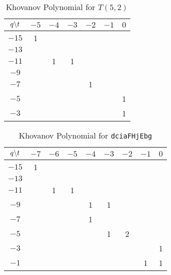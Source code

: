\documentclass{article}
\theoremstyle{plain}
\begin{document}
        \begin{table}[H]
            \centering
            \begin{tabular}{| c | c | c | c | c | c | c |}
                \hline
                $q\symbol{92}t$&$-5$&$-4$&$-3$&$-2$&$-1$&$0$\\
                \hline
                $-15$&1&&&&&\\
                \hline
                $-13$&&&&&&\\
                \hline
                $-11$&&1&1&&&\\
                \hline
                $-9$&&&&&&\\
                \hline
                $-7$&&&&1&&\\
                \hline
                $-5$&&&&&&1\\
                \hline
                $-3$&&&&&&1\\
                \hline
            \end{tabular}
            \caption{Khovanov Polynomial for $T(5,2)$}
            \label{table:t_2_5_kho}
        \end{table}
        \begin{table}[H]
            \centering
            \begin{tabular}{| c | c | c | c | c | c | c | c | c |}
                \hline
                $q\symbol{92}t$&$-7$&$-6$&$-5$&$-4$&$-3$&$-2$&$-1$&$0$\\
                \hline
                $-15$&1&&&&&&&\\
                \hline
                $-13$&&&&&&&&\\
                \hline
                $-11$&&1&1&&&&&\\
                \hline
                $-9$&&&&1&1&&&\\
                \hline
                $-7$&&&&1&&&&\\
                \hline
                $-5$&&&&&1&2&&\\
                \hline
                $-3$&&&&&&&&1\\
                \hline
                $-1$&&&&&&&1&1\\
                \hline
            \end{tabular}
            \caption{Khovanov Polynomial for \texttt{dciaFHjEbg}}
            \label{table:dciaFHjEbg_kho}
        \end{table}
\end{document}
